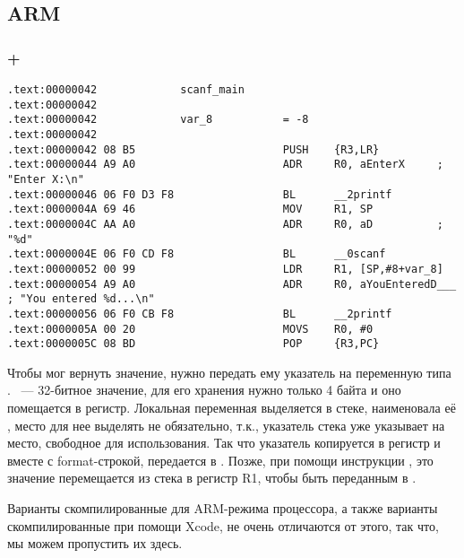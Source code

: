 ﻿\subsection{ARM}

\subsubsection{\OptimizingKeil + \ThumbMode}

\begin{lstlisting}
.text:00000042             scanf_main
.text:00000042
.text:00000042             var_8           = -8
.text:00000042
.text:00000042 08 B5                       PUSH    {R3,LR}
.text:00000044 A9 A0                       ADR     R0, aEnterX     ; "Enter X:\n"
.text:00000046 06 F0 D3 F8                 BL      __2printf
.text:0000004A 69 46                       MOV     R1, SP
.text:0000004C AA A0                       ADR     R0, aD          ; "%d"
.text:0000004E 06 F0 CD F8                 BL      __0scanf
.text:00000052 00 99                       LDR     R1, [SP,#8+var_8]
.text:00000054 A9 A0                       ADR     R0, aYouEnteredD___ ; "You entered %d...\n"
.text:00000056 06 F0 CB F8                 BL      __2printf
.text:0000005A 00 20                       MOVS    R0, #0
.text:0000005C 08 BD                       POP     {R3,PC}
\end{lstlisting}

Чтобы \scanf мог вернуть значение, нужно передать ему указатель на переменную типа \Tint. \Tint ~--- 32-битное 
значение, для его хранения нужно только 4 байта и оно помещается в регистр.
Локальная переменная  выделяется в стеке, \IDA наименовала её , место для нее выделять
не обязательно, т.к., указатель стека \SP уже указывает на место, свободное для использования.
Так что указатель \SP копируется в регистр  и вместе с format-строкой, передается в \scanf.
Позже, при помощи инструкции , это значение перемещается из стека в регистр R1, чтобы быть переданным
в \printf.

Варианты скомпилированные для ARM-режима процессора, а также варианты скомпилированные при помощи Xcode,
не очень отличаются от этого, так что, мы можем пропустить их здесь.

